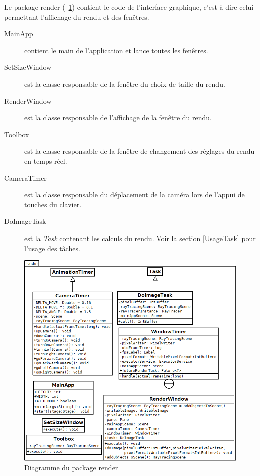 Le package render (\figurename\ \ref{diagRender}) contient le code de l'interface graphique, c'est-à-dire celui permettant l'affichage du rendu et des fenêtres.

\begin{description}
    \item [MainApp] contient le main de l'application et lance toutes les fenêtres.
    \item [SetSizeWindow] est la classe responsable de la fenêtre du choix de taille du rendu.
    \item [RenderWindow] est la classe responsable de l'affichage de la fenêtre du rendu.
    \item [Toolbox] est la classe responsable de la fenêtre de changement des réglages du rendu en temps réel.
    \item [CameraTimer] est la classe responsable du déplacement de la caméra lors de l'appui de touches du clavier.
    \item [DoImageTask] est la \textit{Task} contenant les calculs du rendu. Voir la section \ref{UsageTask} pour l'usage des tâches.
\end{description}



\begin{figure}[h]
   \begin{center}
       \includegraphics[scale=0.5]{diagrammes/diagClassRender.png}
   \end{center}
   \caption{Diagramme du package render \label{diagRender}}
\end{figure}
\FloatBarrier
